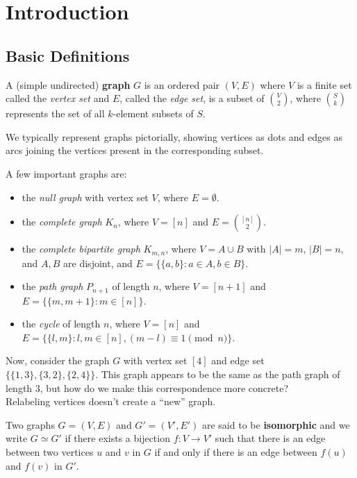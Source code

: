 
\section{Introduction}

	\subsection{Basic Definitions}

		\begin{fdef}
			A (simple undirected) \textbf{graph} $G$ is an ordered pair $(V,E)$ where $V$ is a finite set called the \emph{vertex set} and $E$, called the \emph{edge set}, is a subset of $\binom{V}{2}$, where $\binom{S}{k}$ represents the set of all $k$-element subsets of $S$.
		\end{fdef}

		We typically represent graphs pictorially, showing vertices as dots and edges as arcs joining the vertices present in the corresponding subset.

		A few important graphs are:
		\begin{itemize}
			\item the \emph{null graph} with vertex set $V$, where $E = \emptyset$.
			\item the \emph{complete graph} $K_n$, where $V = [n]$ and $E = \binom{[n]}{2}$.
			\item the \emph{complete bipartite graph} $K_{m,n}$, where $V = A \cup B$ with $|A|=m$, $|B|=n$, and $A,B$ are disjoint, and $E = \{\{a,b\} : a \in A, b \in B\}$.
			\item the \emph{path graph} $P_{n+1}$ of length $n$, where $V = [n+1]$ and $E = \{\{m,m+1\} : m \in [n]\}$.
			\item the \emph{cycle} of length $n$, where $V = [n]$ and $E = \{\{l,m\} : l,m\in [n] , (m - l) \equiv 1 \pmod{n}\}$.
		\end{itemize}

		Now, consider the graph $G$ with vertex set $[4]$ and edge set $\{\{1,3\},\{3,2\},\{2,4\}\}$. This graph appears to be the same as the path graph of length $3$, but how do we make this correspondence more concrete?\\
		Relabeling vertices doesn't create a ``new'' graph.

		\begin{fdef}
			Two graphs $G = (V,E)$ and $G' = (V',E')$ are said to be \textbf{isomorphic} and we write $G \simeq G'$ if there exists a bijection $f : V \to V'$ such that there is an edge between two vertices $u$ and $v$ in $G$ if and only if there is an edge between $f(u)$ and $f(v)$ in $G'$.
		\end{fdef}

